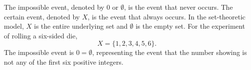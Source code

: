 The impossible event, denoted by $0$ or $\emptyset$, is the event that never occurs. The certain event, denoted by $X$, is the event that always occurs. In the set-theoretic model, $X$ is the entire underlying set and $\emptyset$ is the empty set. For the experiment of rolling a six-sided die,
$$X = \{1,2,3,4,5,6\}.$$
The impossible event is $0 = \emptyset$, representing the event that the number showing is not any of the first six positive integers.

